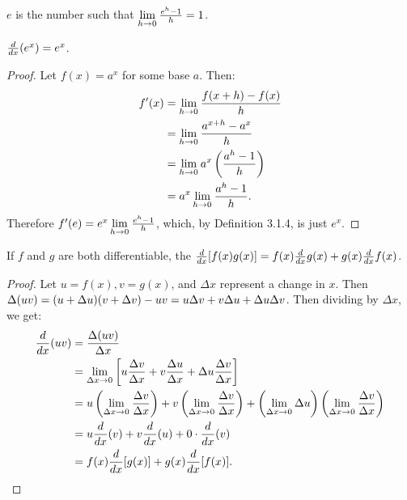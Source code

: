 \documentclass[a4paper,8pt]{article}
\begin{document}
\begin{outline}
    \(e\) is the number such that \(\lim\limits_{h\rightarrow 0^{}}\frac{e^h-1}{h} = 1\).

    \(\frac{d}{dx}(e^x) = e^x\).

    \begin{proof}
      Let \(f(x) = a^x\) for some base \(a\). Then:
      \begin{align*}
        f'(x) &= \lim\limits_{h\rightarrow 0^{}}\frac{f(x+h)-f(x)}{h} \\
              &= \lim\limits_{h\rightarrow 0^{}}\frac{a^{x+h}-a^x}{h} \\
              &= \lim\limits_{h\rightarrow 0^{}}a^x\left(\frac{a^h-1}{h}\right)  \\
              &= a^x\lim\limits_{h\rightarrow 0^{}}\frac{a^h-1}{h}\text{.}
      \end{align*}
      Therefore \(f'(e) = e^x\lim\limits_{h\rightarrow 0^{}}\frac{e^h-1}{h}\), which, by Definition 3.1.4, is just \(e^x\).
    \end{proof}

    If \(f\) and \(g\) are both differentiable, the \(\frac{d}{dx}[f(x)g(x)] = f(x)\frac{d}{dx}g(x) + g(x)\frac{d}{dx}f(x)\).

    \begin{proof}
      Let \(u = f(x), v = g(x)\), and \(\Delta x\) represent a change in \(x\). Then \(\Delta(uv) = (u+\Delta u)
      (v + \Delta v) - uv = u\Delta v + v\Delta u + \Delta u\Delta v\). Then dividing by \(\Delta x\), we get:
      \begin{align*}
        \frac{d}{dx}(uv) &= \frac{\Delta(uv)}{\Delta x}\\
                        &= \lim\limits_{\Delta x\rightarrow 0^{}}\left[u\frac{\Delta v}{\Delta x} + v\frac{\Delta u}{\Delta x} + \Delta u
                            \frac{\Delta v}{\Delta x}\right] \\
                        &= u\left(\lim\limits_{\Delta x\rightarrow 0^{}}\frac{\Delta v}{\Delta x}\right) +
                           v\left(\lim\limits_{\Delta x\rightarrow 0^{}}\frac{\Delta v}{\Delta x}\right) +
                           \left(\lim\limits_{\Delta x\rightarrow 0^{}}\Delta u\right)
                           \left(\lim\limits_{\Delta x\rightarrow 0^{}}\frac{\Delta v}{\Delta x}\right)\\
                        &= u\frac{d}{dx}(v) + v\frac{d}{dx}(u) + 0 \cdot \frac{d}{dx}(v)\\
                        &= f(x)\frac{d}{dx}[g(x)] + g(x)\frac{d}{dx}[f(x)]\text{.}
      \end{align*}
    \end{proof}


\end{outline}
\end{document}
